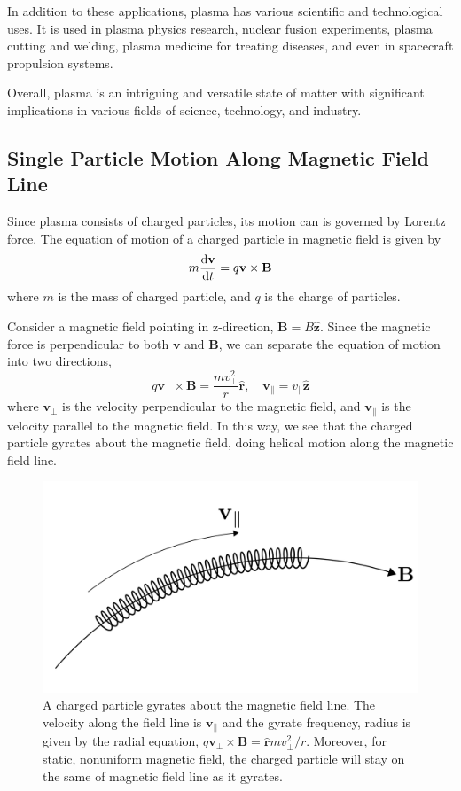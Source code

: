 In addition to these applications, plasma has various scientific and technological uses. 
It is used in plasma physics research, nuclear fusion experiments, plasma cutting and welding, plasma medicine for treating diseases, and even in spacecraft propulsion systems.

Overall, plasma is an intriguing and versatile state of matter with significant implications in various fields of science, technology, and industry.

\subsection{Single Particle Motion Along Magnetic Field Line}
Since plasma consists of charged particles, its motion can is governed by Lorentz force. The equation of motion of a charged particle in magnetic field is given by
\[ m\dv{\mathbf{v}}{t} = q\mathbf{v\times B} \]
where $m$ is the mass of charged particle, and $q$ is the charge of particles.

Consider a magnetic field pointing in z-direction, $\mathbf{B}=B\mathbf{\hat{z}}$. Since the magnetic force is perpendicular to both $\mathbf{v}$ and $\mathbf{B}$, we can separate the equation of motion into two directions,
\[ 
q\mathbf{v_{\perp}\times B} = \frac{mv_{\perp}^2}{r}\mathbf{\hat{r}}, 
\quad
\mathbf{v}_{\parallel} = v_{\parallel} \mathbf{\hat{z}} \]
where $\mathbf{v}_{\perp}$ is the velocity perpendicular to the magnetic field, and $\mathbf{v}_{\parallel}$ is the velocity parallel to the magnetic field. In this way, we see that the charged particle gyrates about the magnetic field, doing helical motion along the magnetic field line. 

\begin{figure}[htbp]
	\centering
	\includegraphics[width=0.7\linewidth]{img/introduction/gyrate-along-b-field}
	\caption{A charged particle gyrates about the magnetic field line. The velocity along the field line is $\mathbf{v}_{\parallel}$ and the gyrate frequency, radius is given by the radial equation, $q\mathbf{v_{\perp}\times B} = \mathbf{\hat{r}} mv_\perp^2/r$. Moreover, for static, nonuniform magnetic field, the charged particle will stay on the same of magnetic field line as it gyrates.}
	\label{fig:gyrate-along-b-field}
\end{figure}

